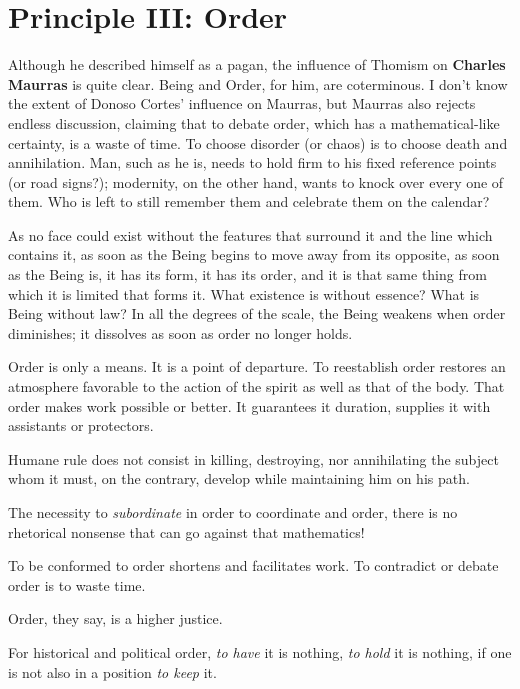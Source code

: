 \section{Principle III: Order}

\begin{quotex}
Although he described himself as a pagan, the influence of Thomism on \textbf{Charles Maurras} is quite clear. Being and Order, for him, are coterminous. I don't know the extent of Donoso Cortes' influence on Maurras, but Maurras also rejects endless discussion, claiming that to debate order, which has a mathematical-like certainty, is a waste of time. To choose disorder (or chaos) is to choose death and annihilation. Man, such as he is, needs to hold firm to his fixed reference points (or road signs?); modernity, on the other hand, wants to knock over every one of them. Who is left to still remember them and celebrate them on the calendar? 

\end{quotex}

As no face could exist without the features that surround it and the line which contains it, as soon as the Being begins to move away from its opposite, as soon as the Being is, it has its form, it has its order, and it is that same thing from which it is limited that forms it. What existence is without essence? What is Being without law? In all the degrees of the scale, the Being weakens when order diminishes; it dissolves as soon as order no longer holds.

Order is only a means. It is a point of departure. To reestablish order restores an atmosphere favorable to the action of the spirit as well as that of the body. That order makes work possible or better. It guarantees it duration, supplies it with assistants or protectors.

Humane rule does not consist in killing, destroying, nor annihilating the subject whom it must, on the contrary, develop while maintaining him on his path.

The necessity to \emph{subordinate} in order to coordinate and order, there is no rhetorical nonsense that can go against that mathematics!

To be conformed to order shortens and facilitates work. To contradict or debate order is to waste time.

Order, they say, is a higher justice.

For historical and political order, \emph{to have} it is nothing, \emph{to hold} it is nothing, if one is not also in a position \emph{to keep} it.

